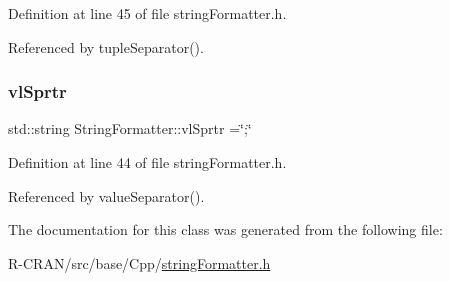 Definition at line 45 of file string\+Formatter.\+h.



Referenced by tuple\+Separator().

\mbox{\label{classStringFormatter_a8ebb161c2bf20bf501b4b42590dc5835}} 
\subsubsection{\texorpdfstring{vl\+Sprtr}{vlSprtr}}
{\footnotesize\ttfamily std\+::string String\+Formatter\+::vl\+Sprtr =\char`\"{};\char`\"{}\hspace{0.3cm}{\ttfamily [private]}}



Definition at line 44 of file string\+Formatter.\+h.



Referenced by value\+Separator().



The documentation for this class was generated from the following file\+:\begin{DoxyCompactItemize}
\item 
R-\/\+C\+R\+A\+N/src/base/\+Cpp/\hyperlink{stringFormatter_8h}{string\+Formatter.\+h}\end{DoxyCompactItemize}
